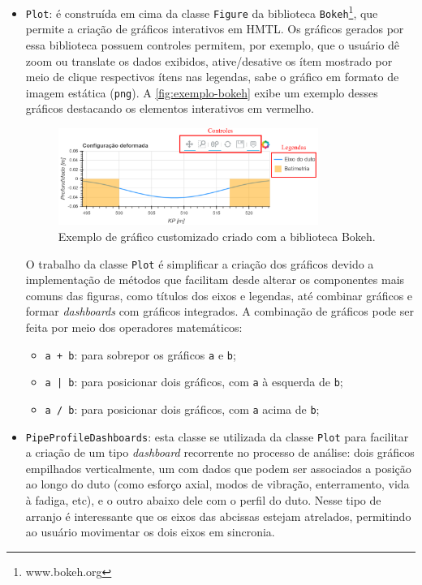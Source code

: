 \begin{itemize}

    \item \texttt{Plot}: é construída em cima da classe \texttt{Figure} da biblioteca \texttt{Bokeh}\footnote{www.bokeh.org}, que permite a criação de gráficos interativos em HMTL. Os gráficos gerados por essa biblioteca possuem controles permitem, por exemplo, que o usuário dê zoom ou translate os dados exibidos, ative/desative os ítem mostrado por meio de clique respectivos ítens nas legendas, sabe o gráfico em formato de imagem estática (\texttt{png}). A \autoref{fig:exemplo-bokeh} exibe um exemplo desses gráficos destacando os elementos interativos em vermelho.

    \begin{figure}[!ht]
        \centering
        \caption{Exemplo de gráfico customizado criado com a biblioteca Bokeh.}\label{fig:exemplo-bokeh}
        \includegraphics[width=0.8\textwidth]{imagens/exemplo-bokeh}
    \end{figure}

    O trabalho da classe \texttt{Plot} é simplificar a criação dos gráficos devido a implementação de métodos que facilitam desde alterar os componentes mais comuns das figuras, como títulos dos eixos e legendas, até combinar gráficos e formar \textit{dashboards} com gráficos integrados. A combinação de gráficos pode ser feita por meio dos operadores matemáticos:
    \begin{itemize}
        \item \texttt{a + b}: para sobrepor os gráficos \texttt{a} e \texttt{b};
        \item \texttt{a | b}: para posicionar dois gráficos, com \texttt{a} à esquerda de \texttt{b};
        \item \texttt{a / b}: para posicionar dois gráficos, com \texttt{a} acima de \texttt{b};
    \end{itemize}

    \item \texttt{PipeProfileDashboards}: esta classe se utilizada da classe \texttt{Plot} para facilitar a criação de um tipo \textit{dashboard} recorrente no processo de análise: dois gráficos empilhados verticalmente, um com dados que podem ser associados a posição ao longo do duto (como esforço axial, modos de vibração, enterramento, vida à fadiga, etc), e o outro abaixo dele com o perfil do duto. Nesse tipo de arranjo é interessante que os eixos das abcissas estejam atrelados, permitindo ao usuário movimentar os dois eixos em sincronia.
\end{itemize}

